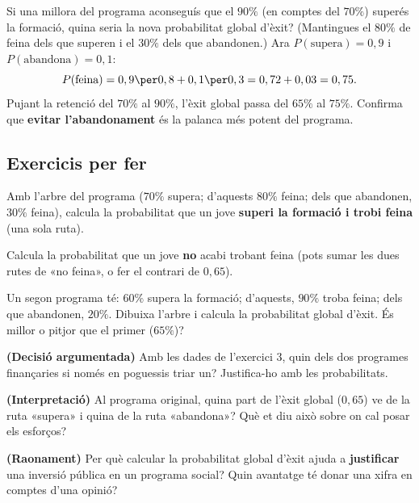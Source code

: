 \begin{exresolt}
Si una millora del programa aconseguís que el $90\%$ (en comptes del $70\%$) superés la
formació, quina seria la nova probabilitat global d'èxit? (Mantingues el $80\%$ de feina
dels que superen i el $30\%$ dels que abandonen.)
\solucio
Ara $P(\text{supera})=0,9$ i $P(\text{abandona})=0,1$:
\[
P(\text{feina})=0,9\per 0,8+0,1\per 0,3=0,72+0,03=0,75.
\]
Pujant la retenció del $70\%$ al $90\%$, l'èxit global passa del $65\%$ al
\textbf{$75\%$}. Confirma que \textbf{evitar l'abandonament} és la palanca més potent
del programa.
\end{exresolt}

\subsection{Exercicis per fer}

\begin{exercicis}
\begin{exlist}
  \item Amb l'arbre del programa ($70\%$ supera; d'aquests $80\%$ feina; dels que
        abandonen, $30\%$ feina), calcula la probabilitat que un jove
        \textbf{superi la formació i trobi feina} (una sola ruta).
  \item Calcula la probabilitat que un jove \textbf{no} acabi trobant feina (pots
        sumar les dues rutes de «no feina», o fer el contrari de $0,65$).
  \item Un segon programa té: $60\%$ supera la formació; d'aquests, $90\%$ troba feina;
        dels que abandonen, $20\%$. Dibuixa l'arbre i calcula la probabilitat global
        d'èxit. És millor o pitjor que el primer ($65\%$)?
  \item \textbf{(Decisió argumentada)} Amb les dades de l'exercici 3, quin dels dos
        programes finançaries si només en poguessis triar un? Justifica-ho amb les
        probabilitats.
  \item \textbf{(Interpretació)} Al programa original, quina part de l'èxit global
        ($0,65$) ve de la ruta «supera» i quina de la ruta «abandona»? Què et diu això
        sobre on cal posar els esforços?
  \item \textbf{(Raonament)} Per què calcular la probabilitat global d'èxit ajuda a
        \textbf{justificar} una inversió pública en un programa social? Quin avantatge té
        donar una xifra en comptes d'una opinió?
\end{exlist}
\end{exercicis}


